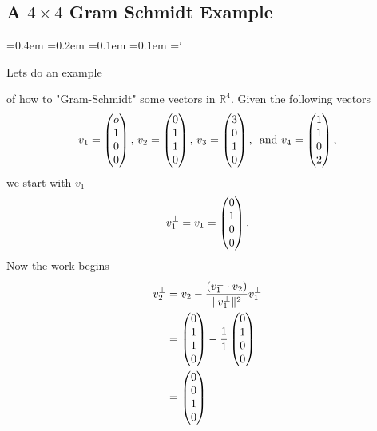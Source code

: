 \subsection*{A $4\times4$ Gram Schmidt Example}

{\ttfamily
{}\font=0.4em
\font=0.2em
\font=0.1em
\font=0.1em
\hyphenchar\font=`\-


\hypertarget{scripts_gram_schmidt_and_orthogonal_complements_4by4_example}{Lets do an example} of how to "Gram-Schmidt" some vectors in $\mathbb{R}^4$. Given the following vectors
\[
v_1 = \begin{pmatrix} o\\1 \\ 0\\ 0 \end{pmatrix}, \, v_2 = \begin{pmatrix} 0\\1\\ 1\\ 0 \end{pmatrix}, \, v_3 = \begin{pmatrix} 3\\0 \\ 1\\ 0 \end{pmatrix}, \, \text{ and } v_4 = \begin{pmatrix} 1\\ 1\\ 0\\2 \end{pmatrix},
\]
we start with $v_1$
\[
v_1^\bot = v_1 =\begin{pmatrix} 0\\1 \\ 0\\ 0 \end{pmatrix}.
\]
Now the work begins
\begin{align*}
v_2^\bot &= v_2 -\frac{(v_1^\bot \cdot v_2) }{\|v_1^\bot\|^2} v_1^\bot \\
&=\begin{pmatrix} 0\\1\\ 1\\ 0 \end{pmatrix} - \frac{1}{1}  \begin{pmatrix} 0\\1 \\ 0\\ 0 \end{pmatrix}\\
&=  \begin{pmatrix} 0\\0\\ 1\\ 0 \end{pmatrix}  \\
\end{align*}


}
